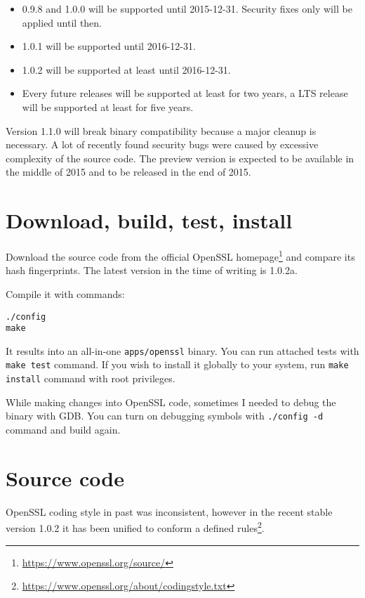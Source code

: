 \begin{itemize}
  \item 0.9.8 and 1.0.0 will be supported until 2015-12-31. Security fixes only will be applied until then.
  \item 1.0.1 will be supported until 2016-12-31.
  \item 1.0.2 will be supported at least until 2016-12-31.
  \item Every future releases will be supported at least for two years, a LTS release will be supported at least for five years.
\end{itemize}

Version 1.1.0 will break binary compatibility because a major cleanup is necessary. A lot of recently found security bugs were caused by excessive complexity of the source code. The preview version is expected to be available in the middle of 2015 and to be released in the end of 2015.

\section{Download, build, test, install}

Download the source code from the official OpenSSL homepage\footnote{\url{https://www.openssl.org/source/}} and compare its hash fingerprints. The latest version in the time of writing is 1.0.2a.

Compile it with commands:

\begin{verbatim}
./config
make
\end{verbatim}

It results into an all-in-one \texttt{apps/openssl} binary. You can run attached tests with \texttt{make test} command. If you wish to install it globally to your system, run \texttt{make install} command with root privileges.

While making changes into OpenSSL code, sometimes I needed to debug the binary with GDB. You can turn on debugging symbols with \texttt{./config -d} command and build again.


\section{Source code}

OpenSSL coding style in past was inconsistent, however in the recent stable version 1.0.2 it has been unified to conform a defined rules\footnote{\url{https://www.openssl.org/about/codingstyle.txt}}.

